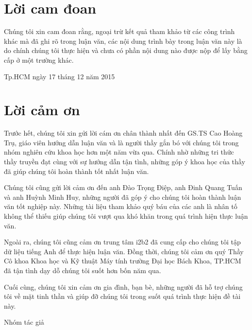 \documentclass[12pt,a4paper,twoside]{report}
\begin{document}

\chapter*{Lời cam đoan}
Chúng tôi xin cam đoan rằng, ngoại trừ kết quả tham khảo từ các công trình khác mà đã ghi rõ trong luận văn, các nội dung trình bày trong luận văn này là do chính chúng tôi thực hiện và chưa có phần nội dung nào được nộp để lấy bằng cấp ở một trường khác.

\begin{flushright}
Tp.HCM ngày 17 tháng 12 năm 2015
\end{flushright}

\chapter*{Lời cảm ơn}
Trước hết, chúng tôi xin gửi lời cám ơn chân thành nhất đến GS.TS Cao Hoàng Trụ, giáo viên hướng dẫn luận văn và là người thầy gắn bó với chúng tôi trong nhóm nghiên cứu khoa học hơn một năm vừa qua. Chính nhờ những tri thức thầy truyền đạt cùng với sự hướng dẫn tận tình, những góp ý khoa học của thầy đã giúp chúng tôi hoàn thành tốt nhất luận văn.

Chúng tôi cũng gửi lời cảm ơn đến anh Đào Trọng Điệp, anh Đinh Quang Tuấn và anh Huỳnh Minh Huy, những người đã góp ý cho chúng tôi hoàn thành luận văn tốt nghiệp này. Những tài liệu tham khảo quý báu của các anh là nhân tố không thể thiếu giúp chúng tôi vượt qua khó khăn trong quá trình hiện thực luận văn.

Ngoài ra, chúng tôi cũng cảm ơn trung tâm i2b2 đã cung cấp cho chúng tôi tập dữ liệu tiếng Anh để thực hiện luận văn. Đồng thời, chúng tôi cảm ơn quý Thầy Cô khoa Khoa học và Kỹ thuật Máy tính trường Đại học Bách Khoa, TP.HCM đã tận tình dạy dỗ chúng tôi suốt hơn bốn năm qua.

Cuối cùng, chúng tôi xin cảm ơn gia đình, bạn bè, những người đã hỗ trợ chúng tôi về mặt tinh thần và giúp đỡ chúng tôi trong suốt quá trình thực hiện đề tài này.

\begin{flushright}
Nhóm tác giả
\end{flushright}
\end{document}
